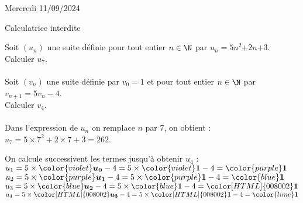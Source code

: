 \documentclass[a4paper,11pt,eval]{nsi}
\begin{document}
\textcolor{UGLiBlue}{Mercredi 11/09/2024}\\
\maketitle
\begin{center}
	Calculatrice interdite
\end{center}

\vspace{1cm}

Soit $(u_n)$ une suite définie pour tout entier $n\in\N$ par $u_n = 5n^2$$+2n$$+3$.\\Calculer $u_{7}$.\\[.5em]
\\

Soit $(v_n)$ une suite définie par $v_0=1$ et pour tout entier $n\in\N$ par $v_{n+1} = 5 v_n -4$.\\Calculer $v_{4}$.\\[.5em]
\\



Dans l'expression de $u_n$ on remplace $n$ par $7$, on obtient : $u_{7} = 5\times 7^2+2\times 7+3=262$.

On calcule successivent les termes jusqu'à obtenir $u_4$ :\\ $u_{1} = 5\times {\color{violet}\boldsymbol{u_{0}}} -4=5 \times {\color{violet}\boldsymbol{1}} -4 =
            {\color{purple}\boldsymbol{1}}$\\ $u_{2} = 5\times {\color{purple}\boldsymbol{u_{1}}} -4=5 \times {\color{purple}\boldsymbol{1}} -4 =
            {\color{blue}\boldsymbol{1}}$\\ $u_{3} = 5\times {\color{blue}\boldsymbol{u_{2}}} -4=5 \times {\color{blue}\boldsymbol{1}} -4 =
            {\color[HTML]{008002}\boldsymbol{1}}$\\ $u_{4} = 5\times {\color[HTML]{008002}\boldsymbol{u_{3}}} -4=5 \times {\color[HTML]{008002}\boldsymbol{1}} -4 =
            {\color{lime}\boldsymbol{1}}$
\end{document}
